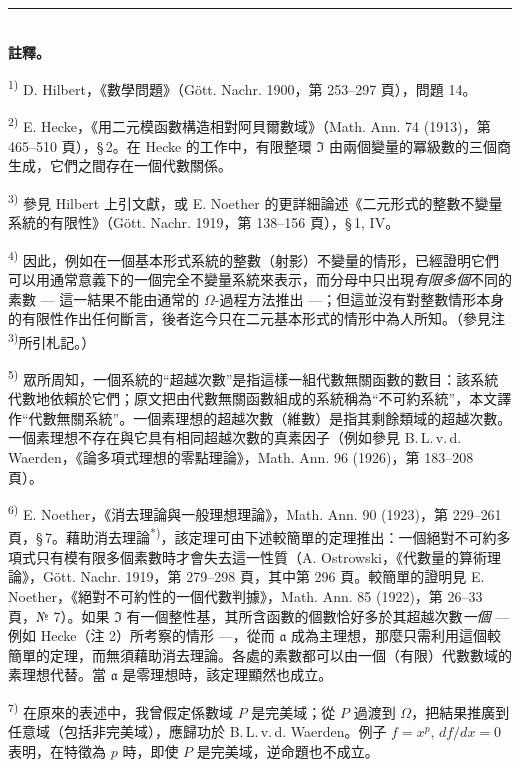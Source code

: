 \documentclass[11pt]{article}
\begin{document}
\begin{center}
\rule{4cm}{0.4pt}\\[0.6em]
\textbf{註釋。}
\end{center}

{\small
\setlength{\parindent}{0pt}
\noindent\textsuperscript{1)} D. Hilbert，《數學問題》（Gött. Nachr. 1900，第 253--297 頁），問題 14。

\noindent\textsuperscript{2)} E. Hecke，《用二元模函數構造相對阿貝爾數域》（Math. Ann. 74 (1913)，第 465--510 頁），\S\,2。在 Hecke 的工作中，有限整環 $\mathfrak{I}$ 由兩個變量的冪級數的三個商生成，它們之間存在一個代數關係。

\noindent\textsuperscript{3)} 參見 Hilbert 上引文獻，或 E. Noether 的更詳細論述《二元形式的整數不變量系統的有限性》（Gött. Nachr. 1919，第 138--156 頁），\S\,1, IV。

\noindent\textsuperscript{4)} 因此，例如在一個基本形式系統的整數（射影）不變量的情形，已經證明它們可以用通常意義下的一個完全不變量系統來表示，而分母中只出現\emph{有限多個}不同的素數 --- 這一結果不能由通常的 $\Omega$-過程方法推出 ---；但這並沒有對整數情形本身的有限性作出任何斷言，後者迄今只在二元基本形式的情形中為人所知。（參見注\textsuperscript{3)}所引札記。）

\noindent\textsuperscript{5)} 眾所周知，一個系統的“超越次數”是指這樣一組代數無關函數的數目：該系統代數地依賴於它們；原文把由代數無關函數組成的系統稱為“不可約系統”，本文譯作“代數無關系統”。一個素理想的超越次數（維數）是指其剩餘類域的超越次數。一個素理想不存在與它具有相同超越次數的真素因子（例如參見 B.\,L.\,v.\,d. Waerden，《論多項式理想的零點理論》，Math. Ann. 96 (1926)，第 183--208 頁）。

\noindent\textsuperscript{6)} E. Noether，《消去理論與一般理想理論》，Math. Ann. 90 (1923)，第 229--261 頁，\S\,7。藉助消去理論\textsuperscript{*)}，該定理可由下述較簡單的定理推出：一個絕對不可約多項式只有模有限多個素數時才會失去這一性質（A. Ostrowski，《代數量的算術理論》，Gött. Nachr. 1919，第 279--298 頁，其中第 296 頁。較簡單的證明見 E. Noether，《絕對不可約性的一個代數判據》，Math. Ann. 85 (1922)，第 26--33 頁，№ 7）。如果 $\mathfrak{I}$ 有一個整性基，其所含函數的個數恰好多於其超越次數\emph{一個} --- 例如 Hecke（注 2）所考察的情形 ---，從而 $\mathfrak{a}$ 成為主理想，那麼只需利用這個較簡單的定理，而無須藉助消去理論。各處的素數都可以由一個（有限）代數數域的素理想代替。當 $\mathfrak{a}$ 是零理想時，該定理顯然也成立。

\noindent\textsuperscript{7)} 在原來的表述中，我曾假定係數域 $P$ 是完美域；從 $P$ 過渡到 $\Omega$，把結果推廣到任意域（包括非完美域），應歸功於 B.\,L.\,v.\,d. Waerden。例子 $f=x^p$, $df/dx=0$ 表明，在特徵為 $p$ 時，即使 $P$ 是完美域，逆命題也不成立。

}
\end{document}
